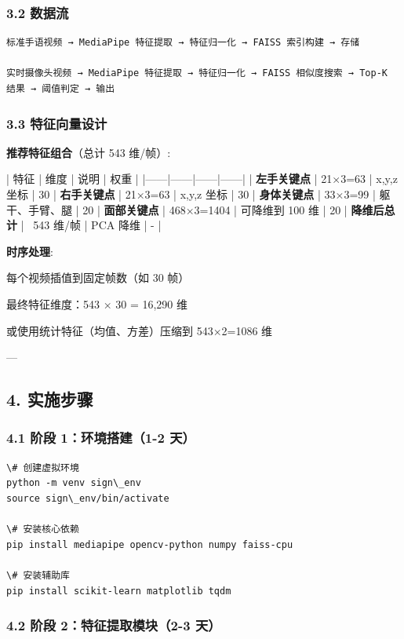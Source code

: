 \documentclass[a4paper,12pt]{article}
\begin{document}
\subsubsection{3.2 数据流}

\begin{verbatim}
标准手语视频 → MediaPipe 特征提取 → 特征归一化 → FAISS 索引构建 → 存储

实时摄像头视频 → MediaPipe 特征提取 → 特征归一化 → FAISS 相似度搜索 → Top-K 结果 → 阈值判定 → 输出
\end{verbatim}


\subsubsection{3.3 特征向量设计}

\textbf{推荐特征组合}（总计 543 维/帧）:

| 特征 | 维度 | 说明 | 权重 |
|------|------|------|------|
| \textbf{左手关键点} | 21×3=63 | x,y,z 坐标 | 30%
| \textbf{右手关键点} | 21×3=63 | x,y,z 坐标 | 30%
| \textbf{身体关键点} | 33×3=99 | 躯干、手臂、腿 | 20%
| \textbf{面部关键点} | 468×3=1404 | 可降维到 100 维 | 20%
| \textbf{降维后总计} | ~543 维/帧 | PCA 降维 | - |

\textbf{时序处理}:
\item 每个视频插值到固定帧数（如 30 帧）
\item 最终特征维度：543 × 30 = 16,290 维
\item 或使用统计特征（均值、方差）压缩到 543×2=1086 维

---

\subsection{4. 实施步骤}

\subsubsection{4.1 阶段 1：环境搭建（1-2 天）}

\begin{verbatim}
\# 创建虚拟环境
python -m venv sign\_env
source sign\_env/bin/activate

\# 安装核心依赖
pip install mediapipe opencv-python numpy faiss-cpu

\# 安装辅助库
pip install scikit-learn matplotlib tqdm
\end{verbatim}


\subsubsection{4.2 阶段 2：特征提取模块（2-3 天）}
\end{document}
